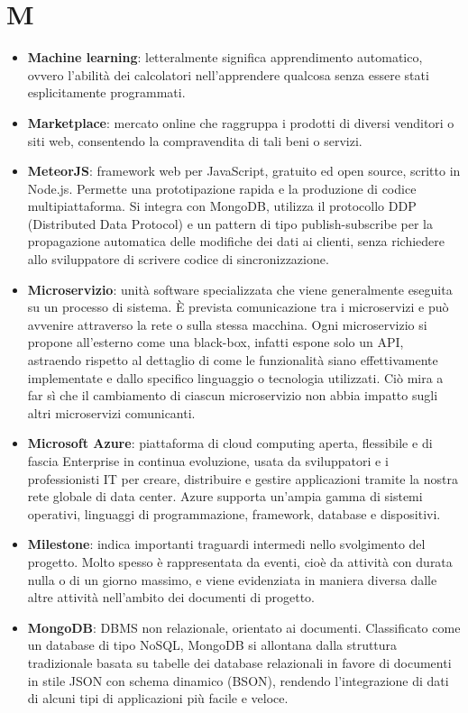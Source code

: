 \newpage
\section{M}

\begin{itemize}
	\item \textbf{Machine learning}: letteralmente significa apprendimento automatico, ovvero l'abilità dei calcolatori nell'apprendere qualcosa senza essere stati esplicitamente programmati.
	\item \textbf{Marketplace}: mercato online che raggruppa i prodotti di diversi venditori o siti web, consentendo la compravendita di tali beni o servizi.
	\item \textbf{MeteorJS}: framework web per JavaScript, gratuito ed open source, scritto in Node.js. Permette una prototipazione rapida e la produzione di codice multipiattaforma. Si integra con MongoDB, utilizza il protocollo DDP (Distributed Data Protocol) e un pattern di tipo publish-subscribe per la propagazione automatica delle modifiche dei dati ai clienti, senza richiedere allo sviluppatore di scrivere codice di sincronizzazione.
	\item \textbf{Microservizio}: unità software specializzata che viene generalmente eseguita su un processo di sistema. \MakeUppercase{è} prevista comunicazione tra i microservizi e può avvenire attraverso la rete o sulla stessa macchina. Ogni microservizio si propone all’esterno come una black-box, infatti espone solo un API, astraendo rispetto al dettaglio di come le funzionalità siano effettivamente implementate e dallo specifico linguaggio o tecnologia utilizzati. Ciò mira a far sì che il cambiamento di ciascun microservizio non abbia impatto sugli altri microservizi comunicanti.
	\item \textbf{Microsoft Azure}: piattaforma di cloud computing aperta, flessibile e di fascia Enterprise in continua evoluzione, usata da sviluppatori e i professionisti IT per creare, distribuire e gestire applicazioni tramite la nostra rete globale di data center. Azure supporta un'ampia gamma di sistemi operativi, linguaggi di programmazione, framework, database e dispositivi.
	\item \textbf{Milestone}: indica importanti traguardi intermedi nello svolgimento del progetto. Molto spesso è rappresentata da eventi, cioè da attività con durata nulla o di un giorno massimo, e viene evidenziata in maniera diversa dalle altre attività nell'ambito dei documenti di progetto.
	\item \textbf{MongoDB}: DBMS non relazionale, orientato ai documenti. Classificato come un database di tipo NoSQL, MongoDB si allontana dalla struttura tradizionale basata su tabelle dei database relazionali in favore di documenti in stile JSON con schema dinamico (BSON), rendendo l'integrazione di dati di alcuni tipi di applicazioni più facile e veloce.
\end{itemize}
